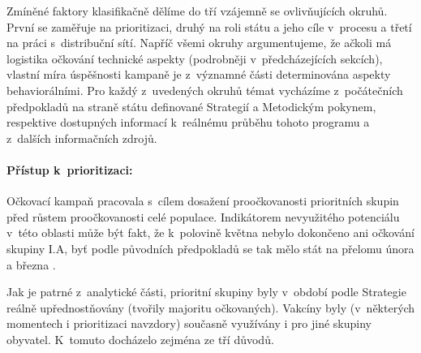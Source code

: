Zmíněné faktory klasifikačně dělíme do tří vzájemně se ovlivňujících okruhů. První se zaměřuje na prioritizaci, druhý na roli státu a jeho cíle v~procesu a třetí na práci s~distribuční sítí. %
%
Napříč všemi okruhy argumentujeme, že ačkoli má logistika očkování technické aspekty (podrobněji v~předcházejících sekcích), vlastní míra úspěšnosti kampaně je z~významné části determinována aspekty behaviorálními. Pro každý z~uvedených okruhů témat vycházíme z~počátečních předpokladů na straně státu definované Strategií a Metodickým pokynem, respektive dostupných informací k~reálnému průběhu tohoto programu a z~dalších informačních zdrojů.


\paragraph{Přístup k~prioritizaci:} Očkovací kampaň pracovala s~cílem dosažení pro\-oč\-ko\-va\-nos\-ti prioritních skupin před růstem pro\-oč\-ko\-va\-nos\-ti celé populace. Indikátorem nevyužitého potenciálu v~této oblasti může být fakt, že k~polovině května nebylo dokončeno ani očkování skupiny I.A, byť podle původních předpokladů se tak mělo stát na přelomu února a března \cite{ockovani_mp}.



Jak je patrné z~analytické části, prioritní skupiny byly v~období podle Strategie reálně upřednostňovány (tvořily majoritu očkovaných). Vakcíny byly (v~některých momentech i prioritizaci navzdory) současně využívány i pro jiné skupiny obyvatel. K~tomuto docházelo zejména ze tří důvodů.
%

